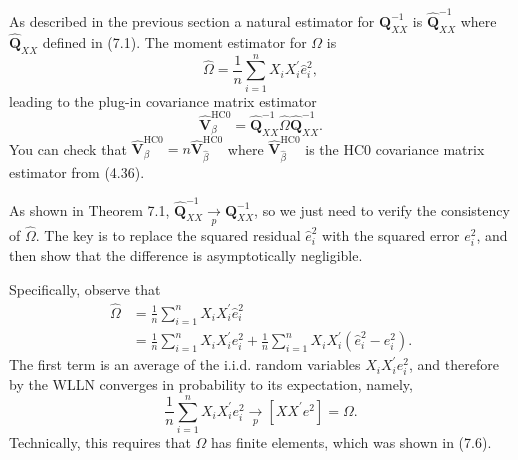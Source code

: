 \documentclass[10pt]{article}
\begin{document}
As described in the previous section a natural estimator for $\boldsymbol{Q}_{X X}^{-1}$ is $\widehat{\boldsymbol{Q}}_{X X}^{-1}$ where $\widehat{\boldsymbol{Q}}_{X X}$ defined in (7.1). The moment estimator for $\Omega$ is
$$
\widehat{\Omega}=\frac{1}{n} \sum_{i=1}^{n} X_{i} X_{i}^{\prime} \widehat{e}_{i}^{2},
$$
leading to the plug-in covariance matrix estimator
$$
\widehat{\boldsymbol{V}}_{\beta}^{\mathrm{HC} 0}=\widehat{\boldsymbol{Q}}_{X X}^{-1} \widehat{\Omega} \widehat{\boldsymbol{Q}}_{X X}^{-1} .
$$
You can check that $\widehat{\boldsymbol{V}}_{\beta}^{\mathrm{HC} 0}=n \widehat{\boldsymbol{V}}_{\widehat{\beta}}^{\mathrm{HC} 0}$ where $\widehat{\boldsymbol{V}}_{\widehat{\beta}}^{\mathrm{HC} 0}$ is the HC0 covariance matrix estimator from (4.36).

As shown in Theorem 7.1, $\widehat{\boldsymbol{Q}}_{X X}^{-1} \underset{p}{\rightarrow} \boldsymbol{Q}_{X X}^{-1}$, so we just need to verify the consistency of $\widehat{\Omega}$. The key is to replace the squared residual $\widehat{e}_{i}^{2}$ with the squared error $e_{i}^{2}$, and then show that the difference is asymptotically negligible.

Specifically, observe that
$$
\begin{aligned}
\widehat{\Omega} &=\frac{1}{n} \sum_{i=1}^{n} X_{i} X_{i}^{\prime} \widehat{e}_{i}^{2} \\
&=\frac{1}{n} \sum_{i=1}^{n} X_{i} X_{i}^{\prime} e_{i}^{2}+\frac{1}{n} \sum_{i=1}^{n} X_{i} X_{i}^{\prime}\left(\widehat{e}_{i}^{2}-e_{i}^{2}\right) .
\end{aligned}
$$
The first term is an average of the i.i.d. random variables $X_{i} X_{i}^{\prime} e_{i}^{2}$, and therefore by the WLLN converges in probability to its expectation, namely,
$$
\frac{1}{n} \sum_{i=1}^{n} X_{i} X_{i}^{\prime} e_{i}^{2} \underset{p}{\longrightarrow}\left[X X^{\prime} e^{2}\right]=\Omega .
$$
Technically, this requires that $\Omega$ has finite elements, which was shown in (7.6).
\end{document}
